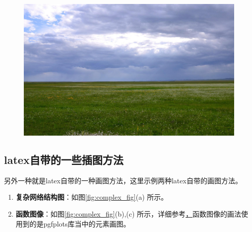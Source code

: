 \begin{figure}[htbp]
{\begin{minipage}[t]{0.48\linewidth}
            \centering
            \includegraphics[width=0.9\linewidth]{figures/xilinguole.jpeg}
        \end{minipage}
    }\vspace{-0.1cm}
    \centering
\end{figure}

\subsection{latex自带的一些插图方法}

另外一种就是latex自带的一种画图方法，这里示例两种latex自带的画图方法。
\begin{enumerate}
    \item \textbf{复杂网络结构图}：如图\ref{fig:complex_fig}(a) 所示。
    \item \textbf{函数图像}：如图\ref{fig:complex_fig}(b),(c) 所示，详细参考\href{https://pgfplots.sourceforge.net/gallery.html}，函数图像的画法使用到的是pgfplots库当中的元素画图。
\end{enumerate}

